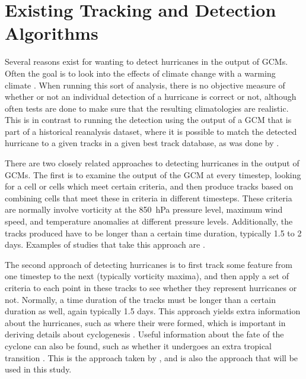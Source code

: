 \documentclass[pdftex,12pt,a4paper]{report}
\begin{document}
\section{Existing Tracking and Detection Algorithms}

Several reasons exist for wanting to detect hurricanes in the output of GCMs. Often the goal is to
look into the effects of climate change with a warming climate \parencite{bengtsson1996, sugi2002,
yoshimura2006}. When running this sort of analysis, there is no objective measure of whether or not
an individual detection of a hurricane is correct or not, although often tests are done to make sure
that the resulting climatologies are realistic. This is in contrast to running the detection using
the output of a GCM that is part of a historical reanalysis dataset, where it is possible to match
the detected hurricane to a given tracks in a given best track database, as was done by
\textcite{walsh1995}.

There are two closely related approaches to detecting hurricanes in the output of GCMs. The first is
to examine the output of the GCM at every timestep, looking for a cell or cells which meet certain
criteria, and then produce tracks based on combining cells that meet these in criteria in different
timesteps. These criteria are normally involve vorticity at the \SI{850}{hPa} pressure level,
maximum wind speed, and temperature anomalies at different pressure levels. Additionally, the tracks
produced have to be longer than a certain time duration, typically 1.5 to 2 days. Examples of
studies that take this approach are \textcite{TODOCITEmultiple}. 

The second approach of detecting hurricanes is to first track some feature from one timestep to the
next (typically vorticity maxima), and then apply a set of criteria to each point in these tracks to
see whether they represent hurricanes or not. Normally, a time duration of the tracks must be longer
than a certain duration as well, again typically 1.5 days. This approach yields extra information
about the hurricanes, such as where their were formed, which is important in deriving details about
cyclogenesis \parencite{TODOCITE}. Useful information about the fate of the cyclone can also be
found, such as whether it undergoes an extra tropical transition \parencite{TODOCITE}. This is the
approach taken by \textcite{TODOCITE, hodges, camargo}, and is also the approach that will be used
in this study.
\end{document}
